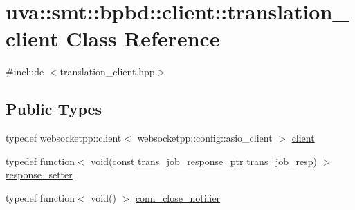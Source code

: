 \hypertarget{classuva_1_1smt_1_1bpbd_1_1client_1_1translation__client}{}\section{uva\+:\+:smt\+:\+:bpbd\+:\+:client\+:\+:translation\+\_\+client Class Reference}
\label{classuva_1_1smt_1_1bpbd_1_1client_1_1translation__client}


{\ttfamily \#include $<$translation\+\_\+client.\+hpp$>$}

\subsection*{Public Types}
\begin{DoxyCompactItemize}
\item 
typedef websocketpp\+::client$<$ websocketpp\+::config\+::asio\+\_\+client $>$ \hyperlink{classuva_1_1smt_1_1bpbd_1_1client_1_1translation__client_a390fa2321ff9549e1f31ca2dcbd4a88c}{client}
\item 
typedef function$<$ void(const \hyperlink{namespaceuva_1_1smt_1_1bpbd_1_1common_1_1messaging_a13f39e68e38d11dbd940edb12359e1a3}{trans\+\_\+job\+\_\+response\+\_\+ptr} trans\+\_\+job\+\_\+resp) $>$ \hyperlink{classuva_1_1smt_1_1bpbd_1_1client_1_1translation__client_aee49acfd2764e30f042c29b1d365f21d}{response\+\_\+setter}
\item 
typedef function$<$ void() $>$ \hyperlink{classuva_1_1smt_1_1bpbd_1_1client_1_1translation__client_a6bb76738c95be98f5d13370d8e6a1176}{conn\+\_\+close\+\_\+notifier}
\end{DoxyCompactItemize}
